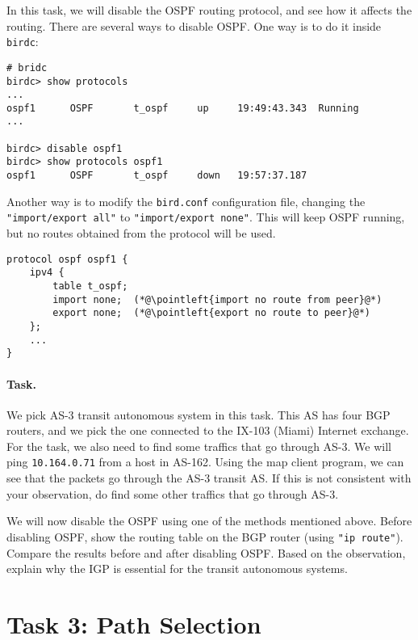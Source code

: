 In this task, we will disable the OSPF routing protocol, and see 
how it affects the routing. There are several ways to disable
OSPF. One way is to do it inside \texttt{birdc}: 

\begin{lstlisting}
# bridc
birdc> show protocols
...
ospf1      OSPF       t_ospf     up     19:49:43.343  Running
...

birdc> disable ospf1
birdc> show protocols ospf1
ospf1      OSPF       t_ospf     down   19:57:37.187
\end{lstlisting}
 
Another way is to modify the \texttt{bird.conf} configuration file,
changing the \texttt{"import/export all"} to 
\texttt{"import/export none"}. This will keep OSPF running, but  
no routes obtained from the protocol will be used. 

\begin{lstlisting}
protocol ospf ospf1 {
    ipv4 {
        table t_ospf;
        import none;  (*@\pointleft{import no route from peer}@*) 
        export none;  (*@\pointleft{export no route to peer}@*) 
    };
    ...
}
\end{lstlisting}
 

\paragraph{Task.} We pick AS-3 transit autonomous system in this 
task. This AS has four BGP routers, and we pick the one 
connected to the IX-103 (Miami) Internet exchange.
For the task, we also need to find some traffics that 
go through AS-3. 
We will ping \texttt{10.164.0.71} from a host in AS-162. Using the 
map client program, we can see that the packets go through
the AS-3 transit AS. If this is not consistent with your observation,
do find some other traffics that go through AS-3. 


We will now disable the OSPF using one of the methods mentioned above.
Before disabling OSPF, show the routing table 
on the BGP router (using \texttt{"ip route"}). Compare the 
results before and after disabling OSPF. Based on the 
observation, explain why the IGP is essential for the transit 
autonomous systems. 



\section{Task 3: Path Selection} 

